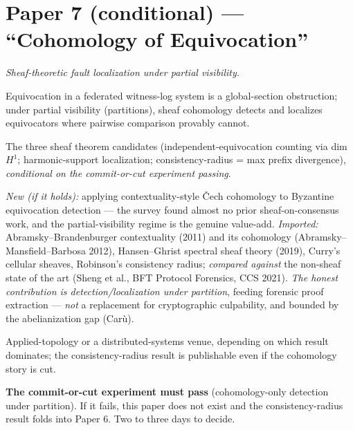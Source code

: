 \documentclass[11pt,a4paper]{article}
\begin{document}
\section{Paper 7 (conditional) --- ``Cohomology of Equivocation''}
\emph{Sheaf-theoretic fault localization under partial visibility.}
\begin{description}[leftmargin=0em,style=unboxed]
\item[Thesis.] Equivocation in a federated witness-log system is a global-section obstruction; under partial visibility (partitions), sheaf cohomology detects and localizes equivocators where pairwise comparison provably cannot.
\item[Results.] The three sheaf theorem candidates (independent-equivocation counting via dim $H^1$; harmonic-support localization; consistency-radius = max prefix divergence), \emph{conditional on the commit-or-cut experiment passing}.
\item[Novelty, honestly.] \emph{New (if it holds):} applying contextuality-style Čech cohomology to Byzantine equivocation detection --- the survey found almost no prior sheaf-on-consensus work, and the partial-visibility regime is the genuine value-add. \emph{Imported:} Abramsky--Brandenburger contextuality (2011) and its cohomology (Abramsky--Mansfield--Barbosa 2012), Hansen--Ghrist spectral sheaf theory (2019), Curry's cellular sheaves, Robinson's consistency radius; \emph{compared against} the non-sheaf state of the art (Sheng et al., BFT Protocol Forensics, CCS 2021). \emph{The honest contribution is detection/localization under partition}, feeding forensic proof extraction --- \emph{not} a replacement for cryptographic culpability, and bounded by the abelianization gap (Car\`u).
\item[Venue.] Applied-topology or a distributed-systems venue, depending on which result dominates; the consistency-radius result is publishable even if the cohomology story is cut.
\item[Gate.] \textbf{The commit-or-cut experiment must pass} (cohomology-only detection under partition). If it fails, this paper does not exist and the consistency-radius result folds into Paper 6. Two to three days to decide.
\end{description}
\end{document}
